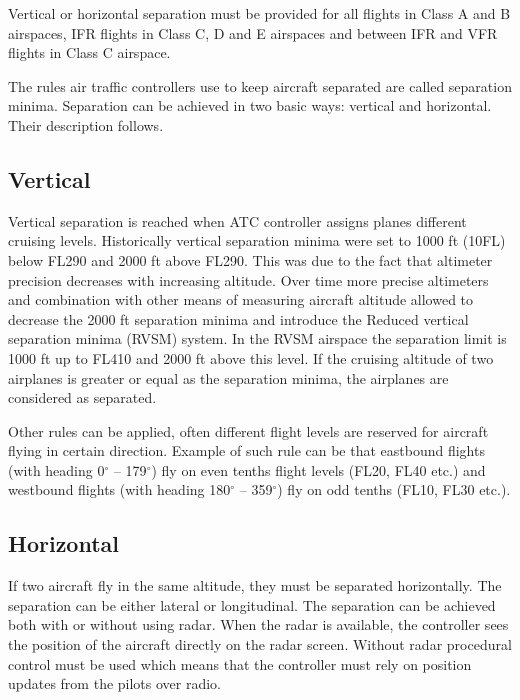 Vertical or horizontal separation must be provided for all flights in Class A and B airspaces, IFR flights in Class C, D and E airspaces and between IFR and VFR flights in Class C airspace. \cite[Chapter 5]{doc4444}

The rules air traffic controllers use to keep aircraft separated are called separation minima. Separation can be achieved in two basic ways: vertical and horizontal. Their description follows.

\subsection{Vertical}

Vertical separation is reached when ATC controller assigns planes different cruising levels. Historically vertical separation minima were set to 1000 ft (10FL) below FL290 and 2000 ft above FL290. This was due to the fact that altimeter precision decreases with increasing altitude. Over time more precise altimeters and combination with other means of measuring aircraft altitude allowed to decrease the 2000 ft separation minima and introduce the Reduced vertical separation minima (RVSM) system. In the RVSM airspace the separation limit is 1000 ft up to FL410 and 2000 ft above this level. If the cruising altitude of two airplanes is greater or equal as the separation minima, the airplanes are considered as separated. \cite{aim}

Other rules can be applied, often different flight levels are reserved for aircraft flying in certain direction. Example of such rule can be that eastbound flights (with heading 0$^{\circ}$ – 179$^{\circ}$) fly on even tenths flight levels (FL20, FL40 etc.) and westbound flights (with heading 180$^{\circ}$ – 359$^{\circ}$) fly on odd tenths (FL10, FL30 etc.).

\subsection{Horizontal}

If two aircraft fly in the same altitude, they must be separated horizontally. The separation can be either lateral or longitudinal. The separation can be achieved both with or without using radar. When the radar is available, the controller sees the position of the aircraft directly on the radar screen. Without radar procedural control must be used which means that the controller must rely on position updates from the pilots over radio.

